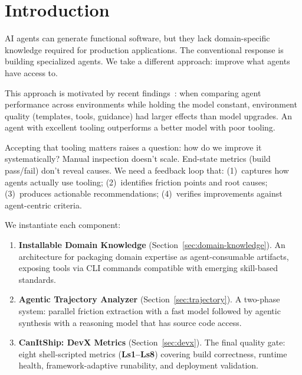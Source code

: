 \documentclass[sigconf,review]{acmart}
\begin{document}


\maketitle

\section{Introduction}
\label{sec:intro}

AI agents can generate functional software, but they lack domain-specific knowledge required for production applications. The conventional response is building specialized agents. We take a different approach: improve what agents have access to.

This approach is motivated by recent findings~\cite{kniazev2025appbuild}: when comparing agent performance across environments while holding the model constant, environment quality (templates, tools, guidance) had larger effects than model upgrades. An agent with excellent tooling outperforms a better model with poor tooling.

Accepting that tooling matters raises a question: how do we improve it systematically? Manual inspection doesn't scale. End-state metrics (build pass/fail) don't reveal causes. We need a feedback loop that: (1)~captures how agents actually use tooling; (2)~identifies friction points and root causes; (3)~produces actionable recommendations; (4)~verifies improvements against agent-centric criteria.

We instantiate each component:

\begin{enumerate}
    \item \textbf{Installable Domain Knowledge} (Section~\ref{sec:domain-knowledge}). An architecture for packaging domain expertise as agent-consumable artifacts, exposing tools via CLI commands compatible with emerging skill-based standards.

    \item \textbf{Agentic Trajectory Analyzer} (Section~\ref{sec:trajectory}). A two-phase system: parallel friction extraction with a fast model followed by agentic synthesis with a reasoning model that has source code access.

    \item \textbf{CanItShip: DevX Metrics} (Section~\ref{sec:devx}). The final quality gate: eight shell-scripted metrics (\textbf{Ls1--Ls8}) covering build correctness, runtime health, framework-adaptive runability, and deployment validation.
\end{enumerate}
\end{document}
